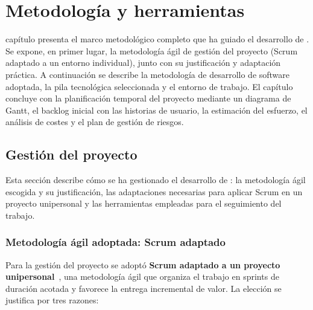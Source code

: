 \chapter{Metodología y herramientas}
\label{chap:metodologia}

 capítulo presenta el marco metodológico completo que ha guiado
el desarrollo de \dataqual.  Se expone, en primer lugar, la metodología ágil
de gestión del proyecto (Scrum adaptado a un entorno individual), junto con
su justificación y adaptación práctica.  A continuación se describe la
metodología de desarrollo de software adoptada, la pila tecnológica
seleccionada y el entorno de trabajo.  El capítulo concluye con la
planificación temporal del proyecto mediante un diagrama de Gantt, el
backlog inicial con las historias de usuario, la estimación del
esfuerzo, el análisis de costes y el plan de gestión de riesgos.


\section{Gestión del proyecto}
\label{sec:gestion-proyecto}

Esta sección describe cómo se ha gestionado el desarrollo de \dataqual: la
metodología ágil escogida y su justificación, las adaptaciones necesarias para
aplicar Scrum en un proyecto unipersonal y las herramientas empleadas para el
seguimiento del trabajo.

\subsection{Metodología ágil adoptada: Scrum adaptado}

Para la gestión del proyecto se adoptó \textbf{Scrum adaptado a un proyecto
unipersonal}~\citep{scrumguide}, una metodología ágil que organiza el trabajo
en sprints de duración acotada y favorece la entrega incremental de valor.
La elección se justifica por tres razones:

